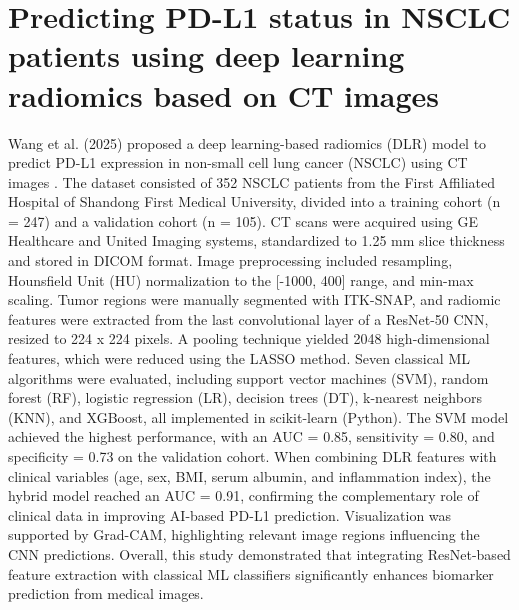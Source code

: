 \section{Predicting PD-L1 status in NSCLC patients using deep learning radiomics based on CT images}

Wang et al. (2025) proposed a deep learning-based radiomics (DLR) model to predict PD-L1 expression in non-small cell lung cancer (NSCLC) using CT images \cite{Lu2025-uo}. The dataset consisted of 352 NSCLC patients from the First Affiliated Hospital of Shandong First Medical University, divided into a training cohort (n = 247) and a validation cohort (n = 105). CT scans were acquired using GE Healthcare and United Imaging systems, standardized to 1.25 mm slice thickness and stored in DICOM format. Image preprocessing included resampling, Hounsfield Unit (HU) normalization to the [-1000, 400] range, and min-max scaling. Tumor regions were manually segmented with ITK-SNAP, and radiomic features were extracted from the last convolutional layer of a ResNet-50 CNN, resized to 224 x 224 pixels. A pooling technique yielded 2048 high-dimensional features, which were reduced using the LASSO method. Seven classical ML algorithms were evaluated, including support vector machines (SVM), random forest (RF), logistic regression (LR), decision trees (DT), k-nearest neighbors (KNN), and XGBoost, all implemented in scikit-learn (Python). The SVM model achieved the highest performance, with an AUC = 0.85, sensitivity = 0.80, and specificity = 0.73 on the validation cohort. When combining DLR features with clinical variables (age, sex, BMI, serum albumin, and inflammation index), the hybrid model reached an AUC = 0.91, confirming the complementary role of clinical data in improving AI-based PD-L1 prediction. Visualization was supported by Grad-CAM, highlighting relevant image regions influencing the CNN predictions. Overall, this study demonstrated that integrating ResNet-based feature extraction with classical ML classifiers significantly enhances biomarker prediction from medical images.